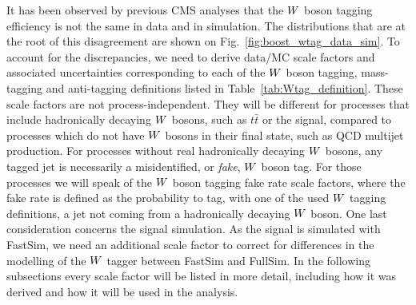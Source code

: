 It has been observed by previous CMS analyses that the $W$ boson tagging efficiency is not the same
in data and in simulation. The distributions that are at the root of this disagreement are shown on
Fig.~\ref{fig:boost_wtag_data_sim}. 
To account for the discrepancies, we need to derive data/MC scale factors and associated
uncertainties corresponding to each of the $W$ boson tagging, mass-tagging and anti-tagging
definitions listed in Table~\ref{tab:Wtag_definition}. These scale factors are not
process-independent. They will be different for processes that include hadronically decaying $W$
bosons, such as $t\bar{t}$ or the signal, compared to processes which do not have $W$ bosons in
their final state, such as QCD multijet production. For processes without real hadronically
decaying $W$ bosons, any tagged jet is necessarily a misidentified, or \textit{fake}, $W$ boson
tag. For those processes we will speak of the $W$ boson tagging fake rate scale factors, where the
fake rate is defined as the probability to tag, with one of the used $W$ tagging definitions, a jet
not coming from a hadronically decaying $W$ boson. 
One last consideration concerns the signal simulation. As the signal is simulated with FastSim, we
need an additional scale factor to correct for differences in the modelling of the $W$ tagger
between FastSim and FullSim. 
In the following subsections every scale factor will be listed in more detail, including how it was
derived and how it will be used in the analysis. 


